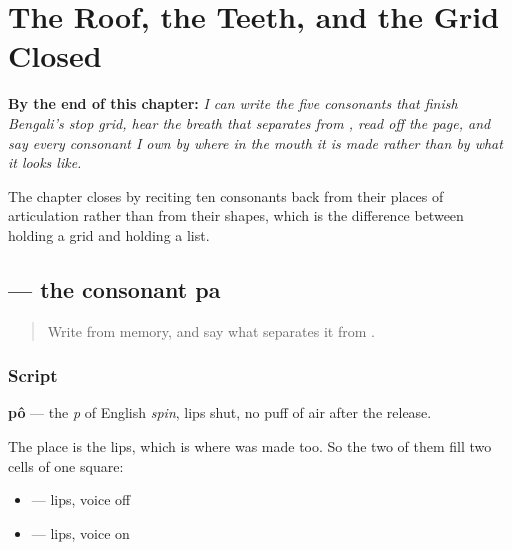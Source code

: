 
\chapter{The Roof, the Teeth, and the Grid Closed}
\label{ch:bn-roof-teeth-grid}

\begin{chapteropening}
\textbf{By the end of this chapter:} \emph{I can write the five consonants that finish Bengali's stop grid, hear the breath that separates  from , read  off the page, and say every consonant I own by where in the mouth it is made rather than by what it looks like.}

The chapter closes by reciting ten consonants back from their places of articulation rather than from their shapes, which is the difference between holding a grid and holding a list.
\end{chapteropening}

\section[\texorpdfstring{\bn{প} (pô)}{প (pô)}]{ — the consonant pa}

\label{lesson:BN-W04-pa}



\begin{quote}
Write \textbf{} from memory, and say what separates it from \textbf{}.
\end{quote}

\subsection*{Script}
\begin{quote}
\end{quote}

\textbf{pô} — the \emph{p} of English \emph{spin}, lips shut, no puff of air after the release.

The place is the lips, which is where \textbf{} was made too. So the two of them fill two cells of one square:

\begin{itemize}
\raggedright
  \item \textbf{} — lips, voice off
  \item \textbf{} — lips, voice on
\end{itemize}

